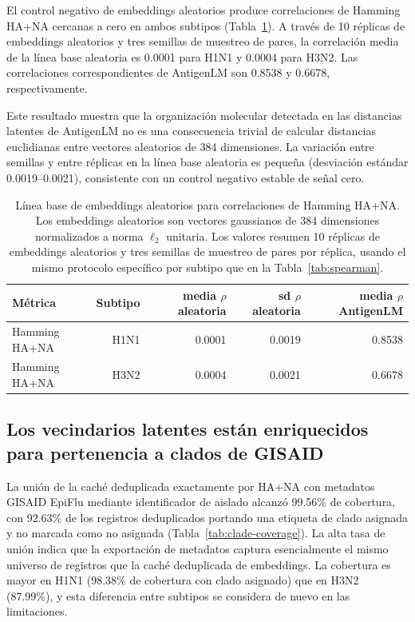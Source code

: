 \documentclass[11pt]{article}
\begin{document}
El control negativo de embeddings aleatorios produce correlaciones de Hamming HA+NA cercanas a cero en ambos subtipos (Tabla~\ref{tab:random-baseline}). A través de 10 réplicas de embeddings aleatorios y tres semillas de muestreo de pares, la correlación media de la línea base aleatoria es 0.0001 para H1N1 y 0.0004 para H3N2. Las correlaciones correspondientes de AntigenLM son 0.8538 y 0.6678, respectivamente.

Este resultado muestra que la organización molecular detectada en las distancias latentes de AntigenLM no es una consecuencia trivial de calcular distancias euclidianas entre vectores aleatorios de 384 dimensiones. La variación entre semillas y entre réplicas en la línea base aleatoria es pequeña (desviación estándar 0.0019--0.0021), consistente con un control negativo estable de señal cero.

\begin{table}[H]
\centering
\caption{Línea base de embeddings aleatorios para correlaciones de Hamming HA+NA. Los embeddings aleatorios son vectores gaussianos de 384 dimensiones normalizados a norma $\ell_2$ unitaria. Los valores resumen 10 réplicas de embeddings aleatorios y tres semillas de muestreo de pares por réplica, usando el mismo protocolo específico por subtipo que en la Tabla~\ref{tab:spearman}.}
\label{tab:random-baseline}
\begin{tabular}{lrrrr}
\toprule
Métrica & Subtipo & media $\rho$ aleatoria & sd $\rho$ aleatoria & media $\rho$ AntigenLM \\
\midrule
Hamming HA+NA & H1N1 & 0.0001 & 0.0019 & 0.8538 \\
Hamming HA+NA & H3N2 & 0.0004 & 0.0021 & 0.6678 \\
\bottomrule
\end{tabular}
\end{table}

\subsection{Los vecindarios latentes están enriquecidos para pertenencia a clados de GISAID}

La unión de la caché deduplicada exactamente por HA+NA con metadatos GISAID EpiFlu mediante identificador de aislado alcanzó 99.56\% de cobertura, con 92.63\% de los registros deduplicados portando una etiqueta de clado asignada y no marcada como no asignada (Tabla~\ref{tab:clade-coverage}). La alta tasa de unión indica que la exportación de metadatos captura esencialmente el mismo universo de registros que la caché deduplicada de embeddings. La cobertura es mayor en H1N1 (98.38\% de cobertura con clado asignado) que en H3N2 (87.99\%), y esta diferencia entre subtipos se considera de nuevo en las limitaciones.
\end{document}
